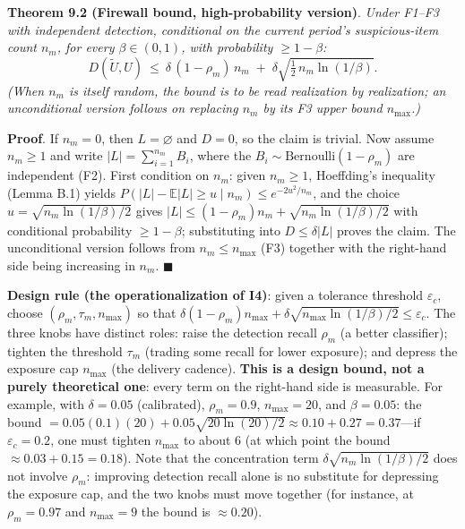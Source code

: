 \documentclass[
  11pt]{article}
\begin{document}
\textbf{Theorem 9.2 (Firewall bound, high-probability version)}.
\emph{Under F1--F3 with independent detection, conditional on the
current period's suspicious-item count \(n_m\), for every
\(\beta \in (0,1)\), with probability \(\ge 1 - \beta\):}
\[D(\tilde U, U) \ \le\ \delta\,(1-\rho_m)\,n_m \;+\; \delta\sqrt{\tfrac{1}{2}\,n_m \ln(1/\beta)}.\]
\emph{(When \(n_m\) is itself random, the bound is to be read
realization by realization; an unconditional version follows on
replacing \(n_m\) by its F3 upper bound \(n_{\max}\).)}

\textbf{Proof}. If \(n_m=0\), then \(L=\varnothing\) and \(D=0\), so the
claim is trivial. Now assume \(n_m\ge1\) and write
\(|L| = \sum_{i=1}^{n_m} B_i\), where the
\(B_i \sim \mathrm{Bernoulli}(1-\rho_m)\) are independent (F2). First
condition on \(n_m\): given \(n_m\ge1\), Hoeffding's inequality (Lemma
B.1) yields \(P(|L| - \mathbb{E}|L| \ge u \mid n_m) \le e^{-2u^2/n_m}\),
and the choice \(u = \sqrt{n_m \ln(1/\beta)/2}\) gives
\(|L| \le (1-\rho_m)n_m + \sqrt{n_m\ln(1/\beta)/2}\) with conditional
probability \(\ge 1-\beta\); substituting into \(D \le \delta|L|\)
proves the claim. The unconditional version follows from
\(n_m \le n_{\max}\) (F3) together with the right-hand side being
increasing in \(n_m\). \(\blacksquare\)

\textbf{Design rule (the operationalization of I4)}: given a tolerance
threshold \(\varepsilon_c\), choose \((\rho_m, \tau_m, n_{\max})\) so
that
\(\delta(1-\rho_m)n_{\max} + \delta\sqrt{n_{\max}\ln(1/\beta)/2} \le \varepsilon_c\).
The three knobs have distinct roles: raise the detection recall
\(\rho_m\) (a better classifier); tighten the threshold \(\tau_m\)
(trading some recall for lower exposure); and depress the exposure cap
\(n_{\max}\) (the delivery cadence). \textbf{This is a design bound, not
a purely theoretical one}: every term on the right-hand side is
measurable. For example, with \(\delta = 0.05\) (calibrated),
\(\rho_m = 0.9\), \(n_{\max} = 20\), and \(\beta = 0.05\): the bound
\(= 0.05(0.1)(20) + 0.05\sqrt{20 \ln(20)/2} \approx 0.10 + 0.27 = 0.37\)---if
\(\varepsilon_c = 0.2\), one must tighten \(n_{\max}\) to about 6 (at
which point the bound \(\approx 0.03 + 0.15 = 0.18\)). Note that the
concentration term \(\delta\sqrt{n_m\ln(1/\beta)/2}\) does not involve
\(\rho_m\): improving detection recall alone is no substitute for
depressing the exposure cap, and the two knobs must move together (for
instance, at \(\rho_m = 0.97\) and \(n_{\max} = 9\) the bound is
\(\approx 0.20\)).
\end{document}
